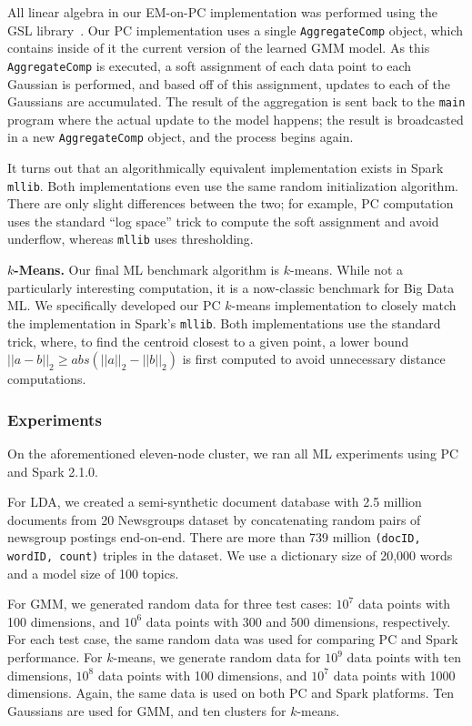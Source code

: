 All linear algebra in our EM-on-PC implementation was performed using
the GSL library~\cite{gsl}.  
Our PC implementation uses a single \texttt{AggregateComp} object, which contains inside of it the current
version of the learned GMM model.  As this  \texttt{AggregateComp} is executed, a soft assignment of each
data point to each Gaussian is performed, and based off of this assignment, updates to each of the Gaussians
are accumulated.  The result of the aggregation is sent back to the \texttt{main} program where the actual update
to the model happens; the result is broadcasted in a new \texttt{AggregateComp} object, and the process begins again.

It turns out that an algorithmically equivalent implementation exists in Spark \texttt{mllib}.
Both implementations even use the same random initialization algorithm.
There are only slight differences between the two; for example, PC computation uses the standard ``log space'' trick to
compute the soft assignment and avoid underflow, whereas \texttt{mllib} uses thresholding.  

\vspace{5pt}
\noindent
\textbf{$k$-Means.} Our final ML benchmark algorithm is $k$-means.  
While not a particularly interesting computation, it is a now-classic
benchmark for Big Data ML.  We specifically developed our PC $k$-means implementation to closely match
the implementation in Spark's \texttt{mllib}.
Both implementations use the standard trick, where, to find the centroid closest to a given point,
a lower bound $||a - b||_2 \geq  abs(||a||_2 - ||b||_2)$ is
first computed to avoid unnecessary distance computations. 

\subsubsection {Experiments}

On the aforementioned eleven-node cluster, 
we ran all ML experiments using PC and Spark 2.1.0.

For LDA,  we
created a semi-synthetic document database with 2.5 million documents from
20 Newsgroups dataset by concatenating random pairs of newsgroup postings
end-on-end. There are more than 739
million \texttt{(docID, wordID, count)} triples in the dataset.
We use a dictionary size
of 20,000 words and a model size of 100 topics. 

For GMM, we generated
random data for three test cases: $10^7$ data
points with 100 dimensions, and $10^6$ data points with 300 and 500
dimensions, respectively. For each test case, the same random data was used
for comparing PC and Spark performance. For $k$-means, we
generate random data for $10^9$ data
points with ten dimensions, $10^8$ data points with 100 dimensions,  and $10^7$
data points with 1000
dimensions. Again, the same data is used on both PC and
Spark platforms.
Ten Gaussians are used for GMM, and ten clusters for $k$-means.

